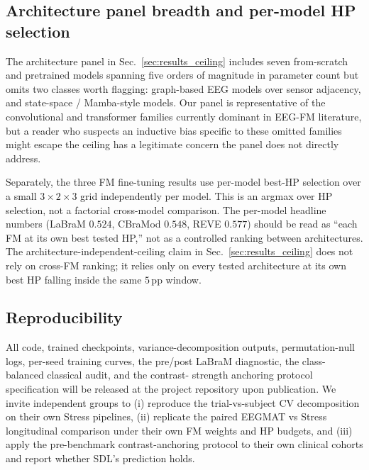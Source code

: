 \subsection{Architecture panel breadth and per-model HP selection}
The architecture panel in Sec.~\ref{sec:results_ceiling} includes
seven from-scratch and pretrained models spanning five orders of
magnitude in parameter count but omits two classes worth flagging:
graph-based EEG models over sensor adjacency, and state-space /
Mamba-style models. Our panel is representative of the convolutional
and transformer families currently dominant in EEG-FM literature, but
a reader who suspects an inductive bias specific to these omitted
families might escape the ceiling has a legitimate concern the panel
does not directly address.

Separately, the three FM fine-tuning results use per-model best-HP
selection over a small $3 \times 2 \times 3$ grid independently per
model. This is an argmax over HP selection, not a factorial
cross-model comparison. The per-model headline numbers
(LaBraM $0.524$, CBraMod $0.548$, REVE $0.577$) should be read as
``each FM at its own best tested HP,'' not as a controlled ranking
between architectures. The architecture-independent-ceiling claim in
Sec.~\ref{sec:results_ceiling} does not rely on cross-FM ranking; it
relies only on every tested architecture at its own best HP falling
inside the same $5$\,pp window.

\subsection{Reproducibility}
All code, trained checkpoints, variance-decomposition outputs,
permutation-null logs, per-seed training curves, the pre/post LaBraM
diagnostic, the class-balanced classical audit, and the contrast-
strength anchoring protocol specification will be released at the
project repository upon publication. We invite independent groups to
(i) reproduce the trial-vs-subject CV decomposition on their own
Stress pipelines, (ii) replicate the paired EEGMAT vs Stress
longitudinal comparison under their own FM weights and HP budgets,
and (iii) apply the pre-benchmark contrast-anchoring protocol to
their own clinical cohorts and report whether SDL's prediction
holds.
